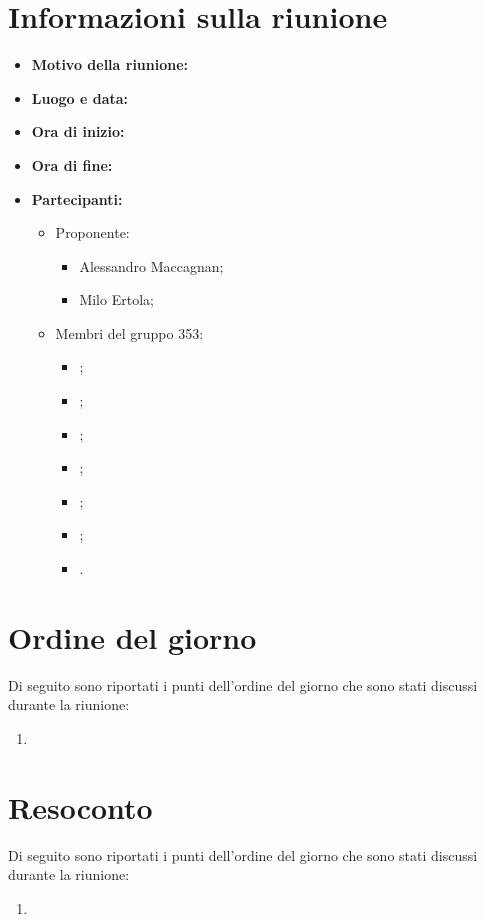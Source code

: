 \documentclass[VER-AAAA-MM-GG.tex]{subfiles}
\begin{document}
\chapter{Informazioni sulla riunione}
\begin{itemize}
	\item \textbf{Motivo della riunione:}
	\item \textbf{Luogo e data:}
	\item \textbf{Ora di inizio:} 
	\item \textbf{Ora di fine:} 
	\item \textbf{Partecipanti:}
	\begin{itemize}
		\item Proponente:
		\begin{itemize}
			\item Alessandro Maccagnan;
			\item Milo Ertola;
		\end{itemize}
		\item Membri del gruppo 353:
		\begin{itemize}
			\item \Davide;
			\item \Elena;
			\item \Gianluca;
			\item \Mirco;
			\item \Parwinder;
			\item \Riccardo;
			\item \Valentina.
		\end{itemize}
	\end{itemize}
\end{itemize}


\chapter{Ordine del giorno}
Di seguito sono riportati i punti dell'ordine del giorno che sono stati discussi durante la riunione:

\begin{enumerate}
	\item 
\end{enumerate}
\chapter{Resoconto}
Di seguito sono riportati i punti dell'ordine del giorno che sono stati discussi durante la riunione:
\begin{enumerate}
	\item 
\end{enumerate}
\end{document}
